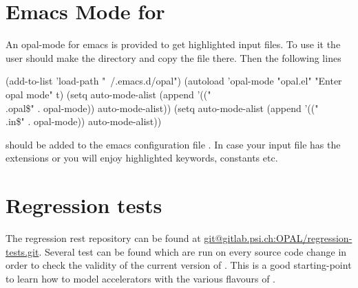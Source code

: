\section{Emacs Mode for \opal}
An opal-mode for emacs is provided to get highlighted input files. To use it the user should make the directory  and copy the file  there. Then the following lines
\begin{footnotesize}
\begin{example}
(add-to-list 'load-path "~/.emacs.d/opal")
(autoload 'opal-mode "opal.el" "Enter opal mode" t)
(setq auto-mode-alist (append '(("\\.opal\$" . opal-mode)) auto-mode-alist))
(setq auto-mode-alist (append '(("\\.in\$" . opal-mode)) auto-mode-alist))
\end{example}
\end{footnotesize}
should be added to the emacs configuration file . In case your input file has the extensions  or   you will enjoy highlighted
keywords, constants etc.

\section{Regression tests}
The regression rest repository can be found at \url{git@gitlab.psi.ch:OPAL/regression-tests.git}. Several test can be found which are
run on every source code change in order to check the validity of the current version of \opal. This is a good starting-point to learn how to
model accelerators with the various flavours of \opal.

